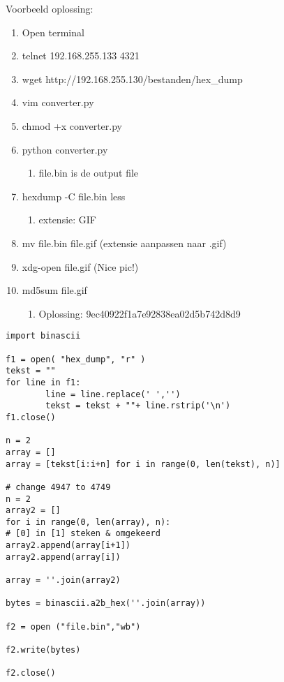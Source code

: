 Voorbeeld oplossing:
\begin{enumerate}
  \item Open terminal
  \item telnet 192.168.255.133 4321
  \item wget http://192.168.255.130/bestanden/hex\_dump
  \item vim converter.py
  \item chmod +x converter.py
  \item python converter.py
  \begin{enumerate}
  \item file.bin is de output file
  \end{enumerate}
  \item hexdump -C file.bin \textbar  less
  \begin{enumerate}
  \item extensie: GIF
  \end{enumerate}
  \item mv file.bin file.gif (extensie aanpassen naar .gif)
  \item xdg-open file.gif (Nice pic!)
  \item md5sum file.gif
  \begin{enumerate}
  \item Oplossing: 9ec40922f1a7e92838ea02d5b742d8d9
  \end{enumerate}
\end{enumerate}

\begin{lstlisting}
import binascii

f1 = open( "hex_dump", "r" )
tekst = ""
for line in f1:
        line = line.replace(' ','')
        tekst = tekst + ""+ line.rstrip('\n')
f1.close()

n = 2
array = []
array = [tekst[i:i+n] for i in range(0, len(tekst), n)]

# change 4947 to 4749
n = 2
array2 = []
for i in range(0, len(array), n):
# [0] in [1] steken & omgekeerd
array2.append(array[i+1])
array2.append(array[i])

array = ''.join(array2)

bytes = binascii.a2b_hex(''.join(array))

f2 = open ("file.bin","wb")

f2.write(bytes)

f2.close()
\end{lstlisting}